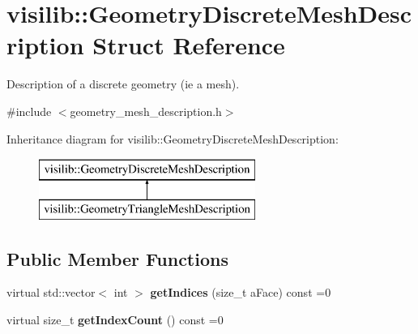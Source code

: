\hypertarget{structvisilib_1_1_geometry_discrete_mesh_description}{}\section{visilib\+::Geometry\+Discrete\+Mesh\+Description Struct Reference}
\label{structvisilib_1_1_geometry_discrete_mesh_description}


Description of a discrete geometry (ie a mesh). 




{\ttfamily \#include $<$geometry\+\_\+mesh\+\_\+description.\+h$>$}

Inheritance diagram for visilib\+::Geometry\+Discrete\+Mesh\+Description\+:\begin{figure}[H]
\begin{center}
\leavevmode
\includegraphics[height=2.000000cm]{structvisilib_1_1_geometry_discrete_mesh_description}
\end{center}
\end{figure}
\subsection*{Public Member Functions}
\begin{DoxyCompactItemize}
\item 
\mbox{\label{structvisilib_1_1_geometry_discrete_mesh_description_a3c6788bb2758cbb7bb75827c0e9dd14f}} 
virtual std\+::vector$<$ int $>$ {\bfseries get\+Indices} (size\+\_\+t a\+Face) const =0
\item 
\mbox{\label{structvisilib_1_1_geometry_discrete_mesh_description_aa15955c8ac869f807470083b065beb7d}} 
virtual size\+\_\+t {\bfseries get\+Index\+Count} () const =0
\end{DoxyCompactItemize}
